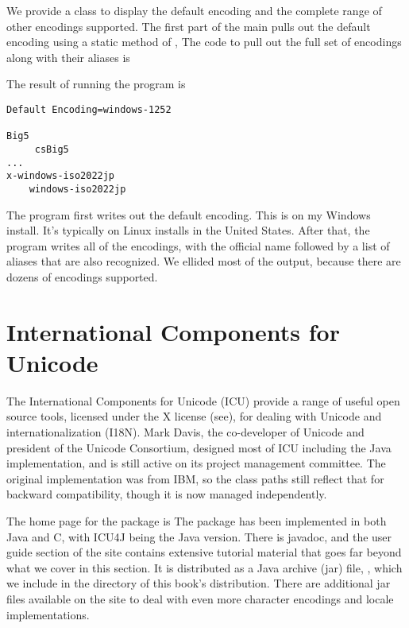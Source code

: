 We provide a class  to
display the default encoding and the complete range of other encodings
supported.  The first part of the main pulls out the default encoding
using a static method of ,
%
%
The code to pull out the full set of encodings along with their
aliases is
%

The result of running the program is
%
\begin{verbatim}
Default Encoding=windows-1252

Big5
     csBig5
...
x-windows-iso2022jp
    windows-iso2022jp
\end{verbatim}
%
The program first writes out the default encoding.  This is
 on my Windows install.  It's typically
 on Linux installs in the United States.
After that, the program writes all of the encodings, with the official
name followed by a list of aliases that are also recognized.  We
ellided most of the output, because there are dozens of encodings
supported.


\section{International Components for Unicode}

The International Components for Unicode (ICU) provide a range of
useful open source tools, licensed under the X license
(see), for dealing with Unicode and
internationalization (I18N).  Mark Davis, the co-developer of Unicode
and president of the Unicode Consortium, designed most of ICU
including the Java implementation, and is still active on its project
management committee.  The original implementation was from IBM, so
the class paths still reflect that for backward compatibility, though
it is now managed independently.

The home page for the package is
%
%
The package has been implemented in both Java and C, with ICU4J
being the Java version.  There is javadoc, and the user guide
section of the site contains extensive tutorial material that goes
far beyond what we cover in this section.  It is distributed
as a Java archive (jar) file, ,
which we include in the 
directory of this book's distribution.  There are additional jar
files available on the site to deal with even more character
encodings and locale implementations.

